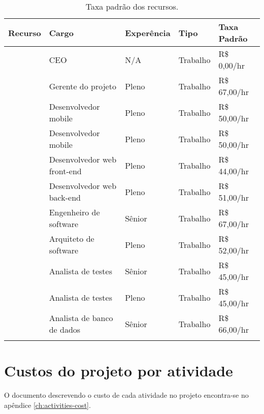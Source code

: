 \begin{longtable}{ p{} p{} l l l }
	\toprule
	\textbf{Recurso}      & \textbf{Cargo}              & \textbf{Experência} & \textbf{Tipo} & \textbf{Taxa Padrão} \\
	\midrule
	\ceoName{}            & CEO                         & N/A                  & Trabalho      & R\$ 0,00/hr           \\
	\midrule
	\projectManagerName{} & Gerente do projeto          & Pleno                & Trabalho      & R\$ 67,00/hr          \\
	\midrule
	\mobDevOneName{}      & Desenvolvedor mobile        & Pleno                & Trabalho      & R\$ 50,00/hr          \\
	\midrule
	\mobDevTwoName{}      & Desenvolvedor mobile        & Pleno                & Trabalho      & R\$ 50,00/hr          \\
	\midrule
	\frontWebDevName{}    & Desenvolvedor web front-end & Pleno                & Trabalho      & R\$ 44,00/hr          \\
	\midrule
	\backWebDevName{}     & Desenvolvedor web back-end  & Pleno                & Trabalho      & R\$ 51,00/hr          \\
	\midrule
	\softEngName{}        & Engenheiro de software      & Sênior              & Trabalho      & R\$ 67,00/hr          \\
	\midrule
	\softArcName{}        & Arquiteto de software       & Pleno                & Trabalho      & R\$ 52,00/hr          \\
	\midrule
	\testAnalOneName{}    & Analista de testes          & Sênior              & Trabalho      & R\$ 45,00/hr          \\
	\midrule
	\testAnalTwoName{}    & Analista de testes          & Pleno                & Trabalho      & R\$ 45,00/hr          \\
	\midrule
	\dbAnalName{}         & Analista de banco de dados  & Sênior              & Trabalho      & R\$ 66,00/hr          \\
	\bottomrule
	\caption{Taxa padrão dos recursos.}
	\centering
\end{longtable}

\section{Custos do projeto por atividade}

O documento descrevendo o custo de cada atividade no projeto encontra-se no apêndice \ref{ch:activities-cost}.

